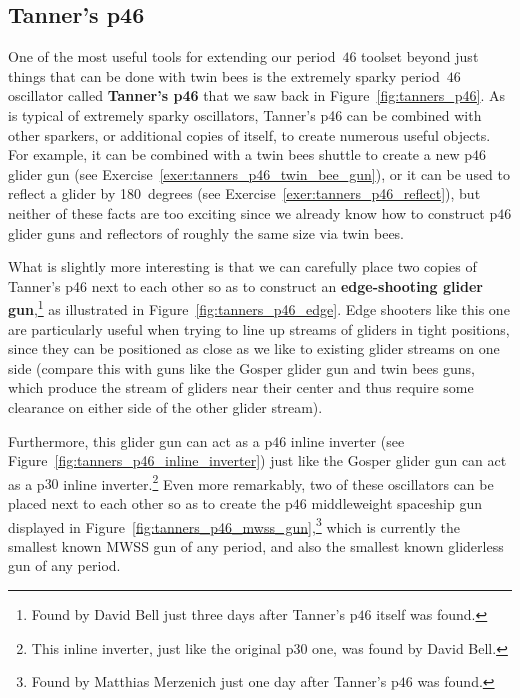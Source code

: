 \subsection{Tanner's p46}\label{sec:p46_tanner}

One of the most useful tools for extending our period~$46$ toolset beyond just things that can be done with twin bees is the extremely sparky period~$46$ oscillator called \textbf{Tanner's p46} that we saw back in Figure~\ref{fig:tanners_p46}. As is typical of extremely sparky oscillators, Tanner's p46 can be combined with other sparkers, or additional copies of itself, to create numerous useful objects. For example, it can be combined with a twin bees shuttle to create a new p$46$ glider gun (see Exercise~\ref{exer:tanners_p46_twin_bee_gun}), or it can be used to reflect a glider by 180~degrees (see Exercise~\ref{exer:tanners_p46_reflect}), but neither of these facts are too exciting since we already know how to construct p$46$ glider guns and reflectors of roughly the same size via twin bees.

What is slightly more interesting is that we can carefully place two copies of Tanner's p46 next to each other so as to construct an \textbf{edge-shooting glider gun},\footnote{Found by David Bell just three days after Tanner's p$46$ itself was found.} as illustrated in Figure~\ref{fig:tanners_p46_edge}. Edge shooters like this one are particularly useful when trying to line up streams of gliders in tight positions, since they can be positioned as close as we like to existing glider streams on one side (compare this with guns like the Gosper glider gun and twin bees guns, which produce the stream of gliders near their center and thus require some clearance on either side of the other glider stream).

Furthermore, this glider gun can act as a p$46$ inline inverter (see Figure~\ref{fig:tanners_p46_inline_inverter}) just like the Gosper glider gun can act as a p$30$ inline inverter.\footnote{This inline inverter, just like the original p$30$ one, was found by David Bell.} Even more remarkably, two of these oscillators can be placed next to each other so as to create the p$46$ middleweight spaceship gun displayed in Figure~\ref{fig:tanners_p46_mwss_gun},\footnote{Found by Matthias Merzenich just one day after Tanner's p$46$ was found.} which is currently the smallest known MWSS gun of any period, and also the smallest known gliderless gun of any period.

